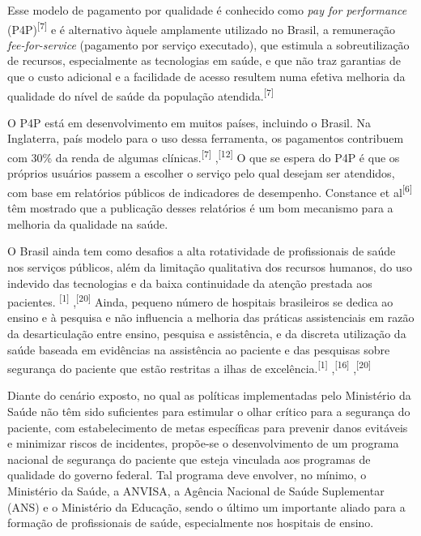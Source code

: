 \documentclass{article}
\begin{document}
Esse modelo de pagamento por qualidade é conhecido como \textit{pay for
performance}
(P4P)\textsuperscript{[7]}
e é alternativo àquele amplamente utilizado no Brasil, a remuneração
\textit{fee-for-service}
(pagamento por serviço executado), que estimula a
sobreutilização de recursos, especialmente as tecnologias em saúde, e que não
traz garantias
de que o custo adicional e a facilidade de acesso resultem numa efetiva melhoria
da
qualidade do nível de saúde da população atendida.\textsuperscript{[7]}

O P4P está em desenvolvimento em muitos países, incluindo o Brasil. Na
Inglaterra, país
modelo para o uso dessa ferramenta, os pagamentos contribuem com 30\% da renda
de algumas
clínicas.\textsuperscript{[7]}
,\textsuperscript{[12]}
O que se espera do P4P é que os próprios usuários passem a escolher o serviço
pelo
qual desejam ser atendidos, com base em relatórios públicos de indicadores de
desempenho.
Constance et al\textsuperscript{[6]}
têm mostrado que a publicação desses relatórios é um bom mecanismo para a
melhoria
da qualidade na saúde.

O Brasil ainda tem como desafios a alta rotatividade de profissionais de saúde
nos serviços
públicos, além da limitação qualitativa dos recursos humanos, do uso indevido
das
tecnologias e da baixa continuidade da atenção prestada aos pacientes.
\textsuperscript{[1]}
,\textsuperscript{[20]}
Ainda, pequeno número de hospitais brasileiros se dedica ao ensino e à pesquisa
e
não influencia a melhoria das práticas assistenciais em razão da desarticulação
entre
ensino, pesquisa e assistência, e da discreta utilização da saúde baseada em
evidências na
assistência ao paciente e das pesquisas sobre segurança do paciente que estão
restritas a
ilhas de excelência.\textsuperscript{[1]}
,\textsuperscript{[16]}
,\textsuperscript{[20]}

Diante do cenário exposto, no qual as políticas implementadas pelo Ministério da
Saúde não
têm sido suficientes para estimular o olhar crítico para a segurança do
paciente, com
estabelecimento de metas específicas para prevenir danos evitáveis e minimizar
riscos de
incidentes, propõe-se o desenvolvimento de um programa nacional de segurança do
paciente que
esteja vinculada aos programas de qualidade do governo federal. Tal programa
deve envolver,
no mínimo, o Ministério da Saúde, a ANVISA, a Agência Nacional de Saúde
Suplementar (ANS) e
o Ministério da Educação, sendo o último um importante aliado para a formação de
profissionais de saúde, especialmente nos hospitais de ensino.
\end{document}
